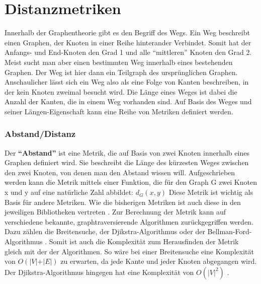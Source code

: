 \documentclass[a4paper,12pt,ngerman,chapterprefix=false,listof=totoc,bibliography=totoc]{scrreprt}
\begin{document}
\section{Distanzmetriken}
{
Innerhalb der Graphentheorie gibt es den Begriff des Wegs. Ein Weg beschreibt einen Graphen, der Knoten in einer Reihe hinterander Verbindet. Somit hat der Anfangs- und End-Knoten den Grad 1 und alle "`mittleren"' Knoten den Grad 2. Meist sucht man aber einen bestimmten Weg innerhalb eines bestehenden Graphen. Der Weg ist hier dann ein Teilgraph des ursprünglichen Graphen. Anschaulicher lässt sich ein Weg also als eine Folge von Kanten beschreiben, in der kein Knoten zweimal besucht wird. Die Länge eines Weges ist dabei die Anzahl der Kanten, die in einem Weg vorhanden sind. \cite{diestel_graphentheorie_2000} Auf Basis des Weges und seiner Längen-Eigenschaft kann eine Reihe von Metriken definiert werden.
\subsubsection*{Abstand/Distanz}
{
Der \textbf{"`Abstand"'} ist eine Metrik, die auf Basis von zwei Knoten innerhalb eines Graphen definiert wird. Sie beschreibt die Länge des kürzesten Weges zwischen den zwei Knoten, von denen man den Abstand wissen will. Aufgeschrieben werden kann die Metrik mittels einer Funktion, die für den Graph G zwei Knoten x und y auf eine natürliche Zahl abbildet: \(d_G (x,y)\) \cite{diestel_graphentheorie_2000} Diese Metrik ist wichtig als Basis für andere Metriken. Wie die bisherigen Metriken ist auch diese in den jeweiligen Bibliotheken vertreten \cite{sagemath_graph_2020,matlab_shortest_2020,wolfram_graph_2020}. Zur Berechnung der Metrik kann auf verschiedene bekannte, graphtraversierende Algorithmen zurückgegriffen werden. Dazu zählen die Breitensuche, der Djikstra-Algorithmus oder der Bellman-Ford-Algorithmus \cite{sagemath_graph_2020}. Somit ist auch die Komplexität zum Herausfinden der Metrik gleich mit der der Algorithmen. So wäre bei einer Breitensuche eine Komplexität von \(O(\vert V\vert +\vert E\vert)\) zu erwarten, da jede Kante und jeder Knoten abgegangen wird. Der Djikstra-Algorithmus hingegen hat eine Komplexität von \(O(\vert V\vert ^2)\) \cite{jungnickel_graphs_2013}.
}
}
\end{document}
